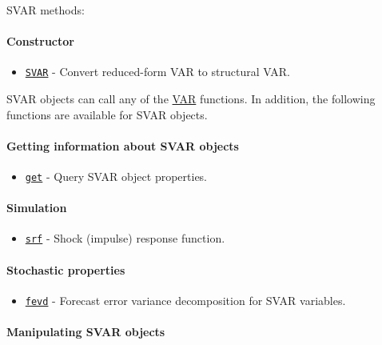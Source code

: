 

	SVAR methods:
 
 \paragraph{Constructor}
 
 \begin{itemize}
 \item
   \href{SVAR/SVAR}{\texttt{SVAR}} - Convert reduced-form VAR to
   structural VAR.
 \end{itemize}
 
 SVAR objects can call any of the \href{VAR/Contents}{VAR} functions. In
 addition, the following functions are available for SVAR objects.
 
 \paragraph{Getting information about SVAR objects}
 
 \begin{itemize}
 \item
   \href{SVAR/get}{\texttt{get}} - Query SVAR object properties.
 \end{itemize}
 
 \paragraph{Simulation}
 
 \begin{itemize}
 \item
   \href{SVAR/srf}{\texttt{srf}} - Shock (impulse) response function.
 \end{itemize}
 
 \paragraph{Stochastic properties}
 
 \begin{itemize}
 \item
   \href{SVAR/fevd}{\texttt{fevd}} - Forecast error variance
   decomposition for SVAR variables.
 \end{itemize}
 
 \paragraph{Manipulating SVAR objects}
 
